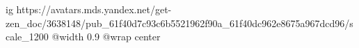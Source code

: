  
 
 
 
 

\ifcmt
  ig https://avatars.mds.yandex.net/get-zen_doc/3638148/pub_61f40d7c93c6b5521962f90a_61f40dc962e8675a967dcd96/scale_1200
  @width 0.9
	@wrap center
\fi
